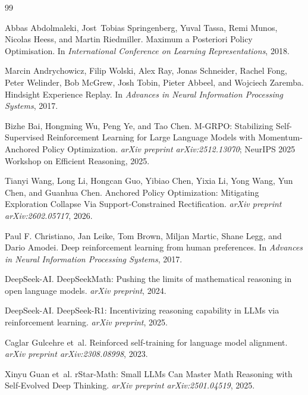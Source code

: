 \documentclass{article}
\begin{document}
\begin{thebibliography}{99}

Abbas Abdolmaleki, Jost~Tobias Springenberg, Yuval Tassa, Remi Munos, Nicolas Heess, and Martin Riedmiller.
\newblock Maximum a Posteriori Policy Optimisation.
\newblock In \emph{International Conference on Learning Representations}, 2018.

Marcin Andrychowicz, Filip Wolski, Alex Ray, Jonas Schneider, Rachel Fong, Peter Welinder, Bob McGrew, Josh Tobin, Pieter Abbeel, and Wojciech Zaremba.
\newblock Hindsight Experience Replay.
\newblock In \emph{Advances in Neural Information Processing Systems}, 2017.

Bizhe Bai, Hongming Wu, Peng Ye, and Tao Chen.
\newblock M-GRPO: Stabilizing Self-Supervised Reinforcement Learning for Large Language Models with Momentum-Anchored Policy Optimization.
\newblock \emph{arXiv preprint arXiv:2512.13070}; NeurIPS 2025 Workshop on Efficient Reasoning, 2025.

Tianyi Wang, Long Li, Hongcan Guo, Yibiao Chen, Yixia Li, Yong Wang, Yun Chen, and Guanhua Chen.
\newblock Anchored Policy Optimization: Mitigating Exploration Collapse Via Support-Constrained Rectification.
\newblock \emph{arXiv preprint arXiv:2602.05717}, 2026.

Paul F. Christiano, Jan Leike, Tom Brown, Miljan Martic, Shane Legg, and Dario Amodei.
\newblock Deep reinforcement learning from human preferences.
\newblock In \emph{Advances in Neural Information Processing Systems}, 2017.

DeepSeek-AI.
\newblock DeepSeekMath: Pushing the limits of mathematical reasoning in open language models.
\newblock \emph{arXiv preprint}, 2024.

DeepSeek-AI.
\newblock DeepSeek-R1: Incentivizing reasoning capability in LLMs via reinforcement learning.
\newblock \emph{arXiv preprint}, 2025.

Caglar Gulcehre et~al.
\newblock Reinforced self-training for language model alignment.
\newblock \emph{arXiv preprint arXiv:2308.08998}, 2023.

Xinyu Guan et~al.
\newblock rStar-Math: Small LLMs Can Master Math Reasoning with Self-Evolved Deep Thinking.
\newblock \emph{arXiv preprint arXiv:2501.04519}, 2025.


\end{thebibliography}
\end{document}
